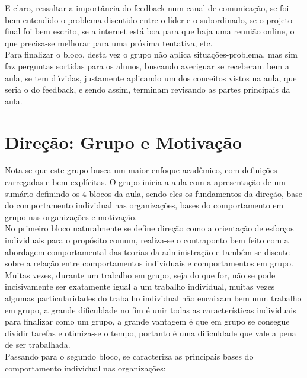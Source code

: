 \documentclass[oneside]{book}
\newcommand\tab[1][1cm]{\hspace*{#1}}
\theoremstyle{definition}
\begin{document}
            \tab E claro, ressaltar a importância do feedback num canal de comunicação, se foi bem entendido o problema discutido entre o líder e o subordinado, se o projeto final foi bem escrito, se a internet está boa para que haja uma reunião online, o que precisa-se melhorar para uma próxima tentativa, etc.\\
            \tab Para finalizar o bloco, desta vez o grupo não aplica situações-problema, mas sim faz perguntas sortidas para os alunos, buscando averiguar se receberam bem a aula, se tem dúvidas, justamente aplicando um dos conceitos vistos na aula, que seria o do feedback, e sendo assim, terminam revisando as partes principais da aula.
            
        \chapter{Direção: Grupo e Motivação}
        \tab Nota-se que este grupo busca um maior enfoque acadêmico, com definições carregadas e bem explícitas. O grupo inicia a aula com a apresentação de um sumário definindo os 4 blocos da aula, sendo eles os fundamentos da direção, base do comportamento individual nas organizações, bases do comportamento em grupo nas organizações e motivação.\\
        \tab No primeiro bloco naturalmente se define direção como a orientação de esforços individuais para o propósito comum, realiza-se o contraponto bem feito com a abordagem comportamental das teorias da administração e também se discute sobre a relação entre comportamentos individuais e comportamentos em grupo.\\
        \tab Muitas vezes, durante um trabalho em grupo, seja do que for, não se pode incisivamente ser exatamente igual a um trabalho individual, muitas vezes algumas particularidades do trabalho individual não encaixam bem num trabalho em grupo, a grande dificuldade no fim é unir todas as características individuais para finalizar como um grupo, a grande vantagem é que em grupo se consegue dividir tarefas e otimiza-se o tempo, portanto é uma dificuldade que vale a pena de ser trabalhada.\\
        \tab Passando para o segundo bloco, se caracteriza as principais bases do comportamento individual nas organizações:
\end{document}
